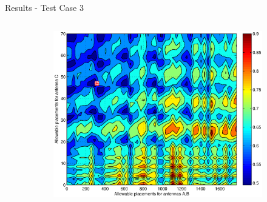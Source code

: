 \documentclass{beamer}
\begin{document}
\begin{frame}{Results - Test Case 3}
    \begin{columns}
        \begin{column}{.4\columnwidth}
            \begin{figure}
                \centering
                \begin{subfigure}{\columnwidth}
                    \includegraphics[width=\columnwidth,height=\columnwidth]{../paper/FIG/tc3_contour}%
                \end{subfigure}\hfill%
            \end{figure}


\end{column}
\end{columns}
\end{frame}
\end{document}
